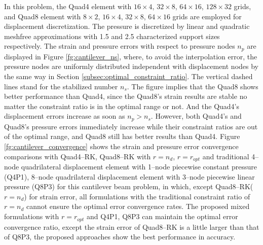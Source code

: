 In this problem, the Quad4 element with $16\times 4$, $32\times 8$, $64\times 16$, $128\times 32$ grids, and Quad8 element with $8\times 2$, $16\times 4$, $32\times 8$, $64\times 16$ grids are employed for displacement discretization. The pressure is discretized by linear and quadratic meshfree approximations with 1.5 and 2.5 characterized support sizes respectively.
The strain and pressure errors with respect to pressure nodes $n_p$ are displayed in Figure \ref{fg:cantilever_ns}, where, to avoid the interpolation error, the pressure nodes are uniformly distributed independent with displacement nodes by the same way in Section \ref{subsec:optimal_constraint_ratio}. 
The vertical dashed lines stand for the stabilized number $n_s$. The figure implies that the Quad8 shows better performance than Quad4, since the Quad8's strain results are stable no matter the constraint ratio is in the optimal range or not. And the Quad4's displacement errors increase as soon as $n_p > n_s$. However, both Quad4's and Quad8's pressure errors immediately increase while their constraint ratios are out of the optimal range, and Quad8 still has better results than Quad4.
Figure \ref{fg:cantilever_convergence} shows the strain and pressure error convergence comparisons with Quad4--RK, Quad8--RK with $r=n_d$, $r=r_{opt}$ and traditional 4--node quadrilateral displacement element with 1--node piecewise constant pressure (Q4P1), 8--node quadrilateral displacement element with 3--node piecewise linear pressure (Q8P3) for this cantilever beam problem, in which, except Quad8--RK($r=n_d$) for strain error, all formulations with the traditional constraint ratio of $r=n_d$ cannot ensure the optimal error convergence rates. The proposed mixed formulations with $r=r_{opt}$ and Q4P1, Q8P3 can maintain the optimal error convergence ratio, except the strain error of Quad8--RK is a little larger than that of Q8P3, the proposed approaches show the best performance in accuracy.

